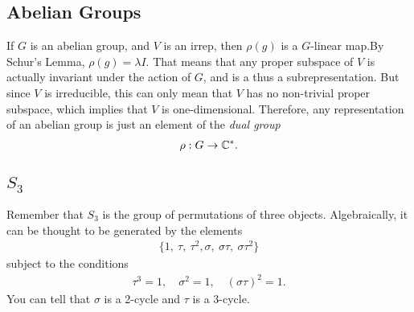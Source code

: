 \subsection{Abelian Groups}
\label{sub:abelian_groups}

If $G$ is an abelian group, and $V$ is an irrep, then $\rho(g)$ is a $G$-linear map.By Schur's Lemma, $\rho(g)=\lambda I$. That means that any proper subspace of $V$ is actually invariant under the action of $G$, and is a thus a subrepresentation. But since $V$ is irreducible, this can only mean that $V$ has no non-trivial proper subspace, which implies that $V$ is one-dimensional. Therefore, any representation of an abelian group is just an element of the \emph{dual group}
\begin{align}
    \rho: G \to \mathbb{C}^*.
\end{align}


\subsection{\texorpdfstring{$S_3$}{S3}}

\begin{insight}
    Remember that $S_3$ is the group of permutations of three objects. Algebraically, it can be thought to be generated by the elements
    \begin{align}
        \{1,\ \tau,\ \tau^2, \sigma,\ \sigma\tau,\ \sigma\tau^2\}
    \end{align}
    subject to the conditions
    \begin{align}
        \tau^3=1,\quad \sigma^2=1,\quad (\sigma\tau)^2=1.
    \end{align}
    You can tell that $\sigma$ is a 2-cycle and $\tau$ is a 3-cycle.
    
\end{insight}

